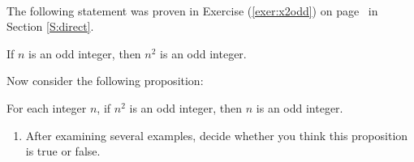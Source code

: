\begin{previewactivity} \label{PA:attempt} \hfill \\
The following statement was proven in Exercise (\ref{exer:x2odd}) on page~\pageref{exer:x2odd} in Section \ref{S:direct}.

\begin{list}{}
  \item If  $n$  is an odd integer, then  $n^2$ is an odd integer.
\end{list}
\vskip10pt
%
\noindent
Now consider the following proposition:
\begin{list}{}
  \item For each integer $n$, if  $n^2 $ is an odd integer, then  $n$  is an odd integer.
\end{list}
%
\begin{enumerate}
  \item After examining several examples, decide whether you think this proposition is true or false.


\end{enumerate}
\end{previewactivity}
